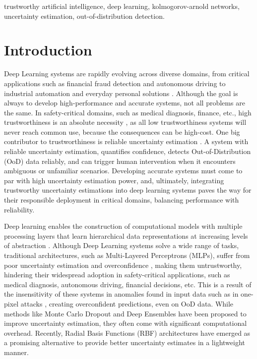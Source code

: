 \documentclass[conference]{IEEEtran}
\begin{document}
\begin{IEEEkeywords}
trustworthy artificial intelligence, deep learning, kolmogorov-arnold networks, uncertainty estimation, out-of-distribution detection.
\end{IEEEkeywords}


\section{Introduction}
Deep Learning systems are rapidly evolving across diverse domains, from critical applications such as financial fraud detection and autonomous driving to industrial automation and everyday personal solutions \cite{10879299} \cite{YAO2024130419} \cite{Ahmed2025}. Although the goal is always to develop high-performance and accurate systems, not all problems are the same. In safety-critical domains, such as medical diagnosis, finance, etc., high trustworthiness is an absolute necessity \cite{ZOU2023100002}, as all low trustworthiness systems will never reach common use, because the consequences can be high-cost. One big contributor to trustworthiness is reliable uncertainty estimation \cite{YAO2024130419}. A system with reliable uncertainty estimation, quantifies confidence, detects Out-of-Distribution (OoD) data reliably, and can trigger human intervention when it encounters ambiguous or unfamiliar scenarios. Developing accurate systems must come to par with high uncertainty estimation power, and, ultimately, integrating trustworthy uncertainty estimations into deep learning systems paves the way for their responsible deployment in critical domains, balancing performance with reliability.

Deep learning enables the construction of computational models with multiple processing layers that learn hierarchical data representations at increasing levels of abstraction \cite{LeCun2015}. Although Deep Learning systems solve a wide range of tasks, traditional architectures, such as Multi-Layered Perceptrons (MLPs), suffer from poor uncertainty estimation and  overconfidence \cite{mucsányi2023trustworthymachinelearning}, making them untrustworthy, hindering their widespread adoption in safety-critical applications, such as medical diagnosis, autonomous driving, financial decisions, etc. This is a result of the insensitivity of these systems in anomalies found in input data such as in one-pixel attacks \cite{su2019one}, creating overconfident predictions, even on OoD data. While methods like Monte Carlo Dropout \cite{10401930} and Deep Ensembles \cite{fort2020deepensembleslosslandscape} have been proposed to improve uncertainty estimation, they often come with significant computational overhead. Recently, Radial Basis Functions (RBF) architectures have emerged as a promising alternative to provide better uncertainty estimates \cite{11087916} in a lightweight manner. 
\end{document}

